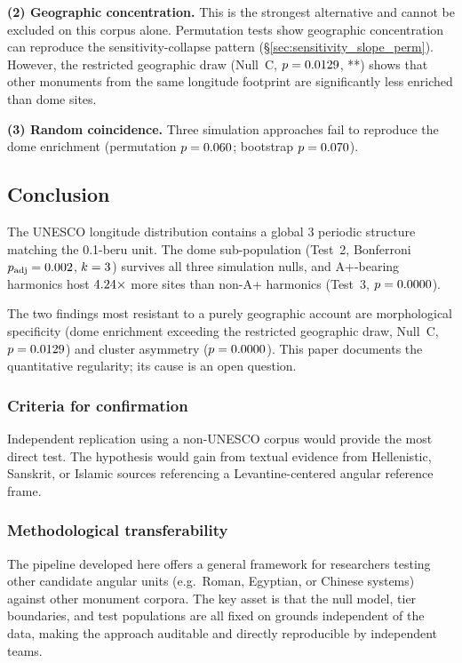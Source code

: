 \documentclass[HARVARD,twocolumn]{USG}
\begin{document}
\textbf{(2) Geographic concentration.}
This is the strongest alternative and cannot be excluded on this corpus
alone. Permutation tests show geographic concentration can reproduce the
sensitivity-collapse pattern (\S\ref{sec:sensitivity_slope_perm}).
However, the restricted geographic draw (Null~C,
$p = 0.0129$, **) shows that other monuments from the
same longitude footprint are significantly less enriched than dome sites.

\textbf{(3) Random coincidence.}
Three simulation approaches fail to reproduce the dome enrichment
(permutation $p = 0.060$; bootstrap $p = 0.070$).

\subsection{Conclusion}

The UNESCO longitude distribution contains a global 3\textdegree{} periodic
structure matching the 0.1-beru unit. The dome sub-population (Test~2,
Bonferroni $p_\mathrm{adj} = 0.002$, $k = 3$) survives all three
simulation nulls, and A+-bearing harmonics host
$4.24\times$ more sites than non-A+ harmonics (Test~3,
$p = 0.0000$).

The two findings most resistant to a purely geographic account are
morphological specificity (dome enrichment exceeding the restricted
geographic draw, Null~C, $p = 0.0129$) and cluster
asymmetry ($p = 0.0000$). This paper documents the quantitative
regularity; its cause is an open question.

\subsubsection*{Criteria for confirmation}

Independent replication using a non-UNESCO corpus would provide the most
direct test. The hypothesis would gain from textual evidence from 
Hellenistic, Sanskrit, or Islamic sources referencing a 
Levantine-centered angular reference frame.

\subsubsection*{Methodological transferability}

The pipeline developed here offers a general framework for researchers
testing other candidate angular units (e.g.\ Roman, Egyptian, or Chinese systems) against other
monument corpora. The key asset is that the null model, tier boundaries,
and test populations are all fixed on grounds independent of the data,
making the approach auditable and directly reproducible by independent teams.
\end{document}
